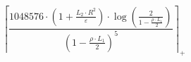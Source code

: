 \[\left\lceil \frac{1048576 \cdot \left(1 + \frac{L_2 \cdot R^{2}}{\varepsilon}\right) \cdot \log\left(\frac{2}{1 - \frac{\rho \cdot L_1}{2}}\right)}{\left(1 - \frac{\rho \cdot L_1}{2}\right)^{5}} \right\rceil_{+}\]
